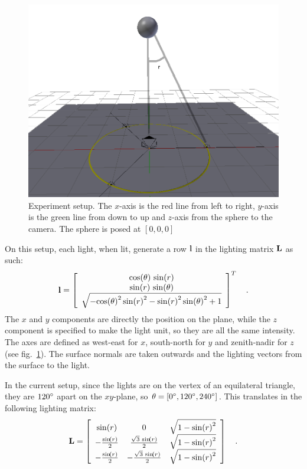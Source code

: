 \documentclass{report}
\begin{document}
\begin{figure}
  \centering
  \includegraphics[width=0.9\linewidth]{q3_setup.png}
  \caption[Experiment setup]
   {Experiment setup. The $x$-axis is the red line from left to right, $y$-axis is the green line from down to up and $z$-axis from the sphere to the camera. The sphere is posed at $\left[0, 0, 0\right]$}
  \label{q3:setup}
\end{figure}

On this setup, each light, when lit, generate a row $\mathbf{l}$ in the lighting matrix $\mathbf{L}$ as such:
\begin{equation}
\B{l} =
\left[\begin{array}{c} \cos\!\left(\theta\right)\, \sin\!\left(r\right) \\ \sin\!\left(r\right)\, \sin\!\left(\theta\right) \\ \sqrt{ - {\cos\!\left(\theta\right)}^2\, {\sin\!\left(r\right)}^2 - {\sin\!\left(r\right)}^2\, {\sin\!\left(\theta\right)}^2 + 1} \end{array}\right]^T
\quad .
\end{equation}
The $x$ and $y$ components are directly the position on the plane, while the $z$ component is specified to make the light unit, so they are all the same intensity. The axes are defined as west-east for $x$, south-north for $y$ and zenith-nadir for $z$ (see fig.~\ref{q3:setup}). The surface normals are taken outwards and the lighting vectors from the surface to the light.

In the current setup, since the lights are on the vertex of an equilateral triangle, they are $120\degree$ apart on the $xy$-plane, so $\theta = \left[ 0\degree, 120\degree, 240\degree \right]$. This translates in the following lighting matrix:
\begin{equation}
\B{L} =
\left[\begin{array}{ccc} \sin\!\left(r\right) & 0 & \sqrt{1 - {\sin\!\left(r\right)}^2}\\ -\frac{\sin\!\left(r\right)}{2} & \frac{\sqrt{3}\, \sin\!\left(r\right)}{2} & \sqrt{1 - {\sin\!\left(r\right)}^2}\\ -\frac{\sin\!\left(r\right)}{2} & -\frac{\sqrt{3}\, \sin\!\left(r\right)}{2} & \sqrt{1 - {\sin\!\left(r\right)}^2} \end{array}\right]
\quad .
\end{equation}
\end{document}
